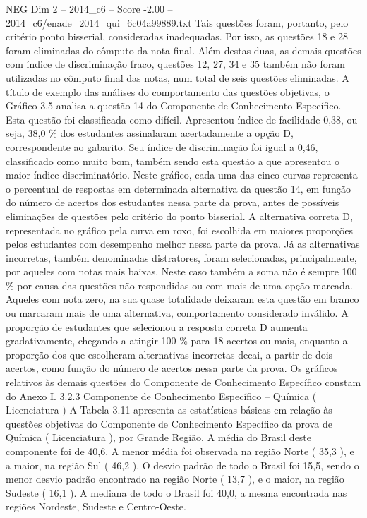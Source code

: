 \begin{textsample}{NEG Dim 2 – 2014\_c6 – Score -2.00 – 2014\_c6/enade\_2014\_qui\_6c04a99889.txt}
Tais questões foram, portanto, pelo critério ponto bisserial, consideradas inadequadas.
Por isso, as questões 18 e 28 foram eliminadas do cômputo da nota final.
Além destas duas, as demais questões com índice de discriminação fraco, questões 12, 27, 34 e 35 também não foram utilizadas no cômputo final das notas, num total de seis questões eliminadas.
A título de exemplo das análises do comportamento das questões objetivas, o Gráfico 3.5 analisa a questão 14 do Componente de Conhecimento Específico.
Esta questão foi classificada como difícil.
Apresentou índice de facilidade 0,38, ou seja, 38,0 \% dos estudantes assinalaram acertadamente a opção D, correspondente ao gabarito.
Seu índice de discriminação foi igual a 0,46, classificado como muito bom, também sendo esta questão a que apresentou o maior índice discriminatório.
Neste gráfico, cada uma das cinco curvas representa o percentual de respostas em determinada alternativa da questão 14, em função do número de acertos dos estudantes nessa parte da prova, antes de possíveis eliminações de questões pelo critério do ponto bisserial.
A alternativa correta D, representada no gráfico pela curva em roxo, foi escolhida em maiores proporções pelos estudantes com desempenho melhor nessa parte da prova.
Já as alternativas incorretas, também denominadas distratores, foram selecionadas, principalmente, por aqueles com notas mais baixas.
Neste caso também a soma não é sempre 100 \% por causa das questões não respondidas ou com mais de uma opção marcada.
Aqueles com nota zero, na sua quase totalidade deixaram esta questão em branco ou marcaram mais de uma alternativa, comportamento considerado inválido.
A proporção de estudantes que selecionou a resposta correta D aumenta gradativamente, chegando a atingir 100 \% para 18 acertos ou mais, enquanto a proporção dos que escolheram alternativas incorretas decai, a partir de dois acertos, como função do número de acertos nessa parte da prova.
Os gráficos relativos às demais questões do Componente de Conhecimento Específico constam do Anexo I. 3.2.3 Componente de Conhecimento Específico – Química ( Licenciatura ) A Tabela 3.11 apresenta as estatísticas básicas em relação às questões objetivas do Componente de Conhecimento Específico da prova de Química ( Licenciatura ), por Grande Região.
A média do Brasil deste componente foi de 40,6.
A menor média foi observada na região Norte ( 35,3 ), e a maior, na região Sul ( 46,2 ).
O desvio padrão de todo o Brasil foi 15,5, sendo o menor desvio padrão encontrado na região Norte ( 13,7 ), e o maior, na região Sudeste ( 16,1 ).
A mediana de todo o Brasil foi 40,0, a mesma encontrada nas regiões Nordeste, Sudeste e Centro-Oeste.

\end{textsample}
